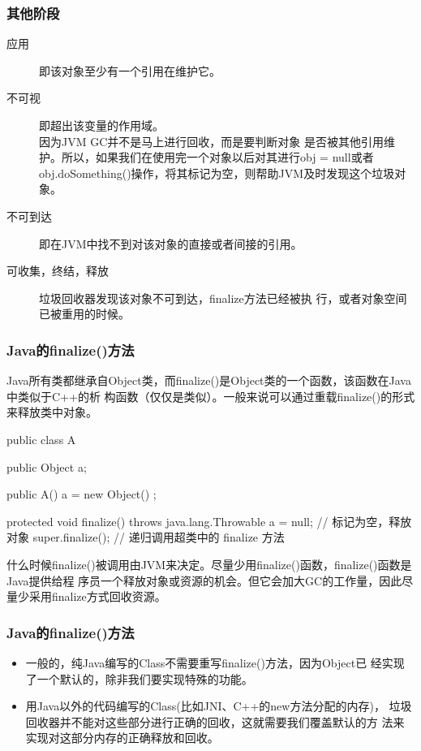 \documentclass[hyperref={pdfpagelabels=false},compress,table]{beamer} %
\newcommand{\hei}{\CJKfamily{SimHei}}
\newcommand{\kai}{\CJKfamily{KaiTi}}
\def\Blue{\color{blue}}
\begin{document}
\begin{frame}[fragile] %
\frametitle{其他阶段}
\begin{description}
\item[应用] 即该对象至少有一个引用在维护它。
\item[不可视] 即超出该变量的作用域。\\{\kai 因为JVM GC并不是马上进行回收，而是要判断对象
    是否被其他引用维护。所以，如果我们在使用完一个对象以后对其进行obj =
    null或者obj.doSomething()操作，将其标记为空，则帮助JVM及时发现这个垃圾对象。}
\item[不可到达] 即在JVM中找不到对该对象的直接或者间接的引用。
\item[可收集，终结，释放] 垃圾回收器发现该对象不可到达，finalize方法已经被执
  行，或者对象空间已被重用的时候。
\end{description}
\end{frame}



\begin{frame}[fragile] %
  \frametitle{Java的finalize()方法}

Java所有类都继承自Object类，而finalize()是Object类的一个函数，该函数在Java中类似于C++的析
构函数（仅仅是类似）。一般来说可以通过重载finalize()的形式来释放类中对象。

\begin{javaCode}
public class A { 
  public Object a; 

  public A() { 
    a = new Object() ;
  } 
  
  protected void finalize() throws java.lang.Throwable { 
    a = null; // 标记为空，释放对象 
    super.finalize(); // 递归调用超类中的 finalize 方法
  }
} 
\end{javaCode}

什么时候finalize()被调用由JVM来决定。{\hei\Blue 尽量少用finalize()函数，finalize()函数是Java提供给程
序员一个释放对象或资源的机会。但它会加大GC的工作量，因此尽量少采用finalize方式回收资源。}
\end{frame}

\begin{frame}[fragile] %
  \frametitle{Java的finalize()方法}
  \begin{itemize}
  \item 一般的，纯Java编写的Class不需要重写finalize()方法，因为Object已
    经实现了一个默认的，除非我们要实现特殊的功能。
  \item 用Java以外的代码编写的Class(比如JNI、C++的new方法分配的内存)，
    垃圾回收器并不能对这些部分进行正确的回收，这就需要我们覆盖默认的方
    法来实现对这部分内存的正确释放和回收。
  \end{itemize}
\end{frame}
\end{document}
